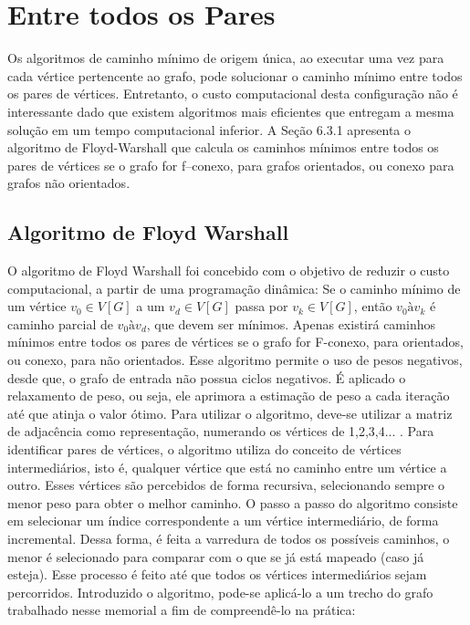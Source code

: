 \section{Entre todos os Pares}\label{sec:entrePares}

Os algoritmos de caminho mínimo de origem única, ao executar uma vez para cada vértice pertencente ao grafo, pode solucionar o caminho mínimo entre todos os pares de vértices.
Entretanto, o custo computacional desta configuração não é interessante dado que existem algoritmos mais eficientes que entregam a mesma solução em um tempo computacional inferior.
A Seção 6.3.1 apresenta o algoritmo de Floyd-Warshall que calcula os caminhos mínimos entre todos os pares de vértices se o grafo for f–conexo, para grafos orientados, ou conexo para
grafos não orientados.

\subsection{Algoritmo de Floyd Warshall}\label{sec:floydW}
O algoritmo de Floyd Warshall foi concebido com o objetivo de reduzir o custo computacional, a partir de uma programação dinâmica: Se o caminho mínimo de um vértice $ v_0 \in V[G] $ a um $ v_d \in V[G] $ passa por $ v_k  \in V[G] $, então $ v_0 \text{à} v_k $ é caminho parcial de $ v_0 \text{à} v_d $, que devem ser mínimos. Apenas existirá caminhos mínimos entre todos os pares de vértices se o grafo for F-conexo, para orientados, ou conexo, para não orientados. Esse algoritmo permite o uso de pesos negativos, desde que, o grafo de entrada não possua ciclos negativos. É aplicado o relaxamento de peso, ou seja, ele aprimora a estimação de peso a cada iteração até que atinja o valor ótimo. Para utilizar o algoritmo, deve-se utilizar a matriz de adjacência como representação, numerando os vértices de 1,2,3,4... . Para identificar pares de vértices, o algoritmo utiliza do conceito de vértices intermediários, isto é, qualquer vértice que está no caminho entre um vértice a outro. Esses vértices são percebidos de forma recursiva, selecionando sempre o menor peso para obter o melhor caminho.
O passo a passo do algoritmo consiste em selecionar um índice correspondente a um vértice intermediário, de forma incremental. Dessa forma, é feita a varredura de todos os possíveis caminhos, o menor é  selecionado para comparar com o que se já está mapeado (caso já esteja). Esse processo é feito até que todos os vértices intermediários sejam percorridos.
Introduzido o algoritmo, pode-se aplicá-lo a um trecho do grafo trabalhado nesse memorial a fim de compreendê-lo na prática:

